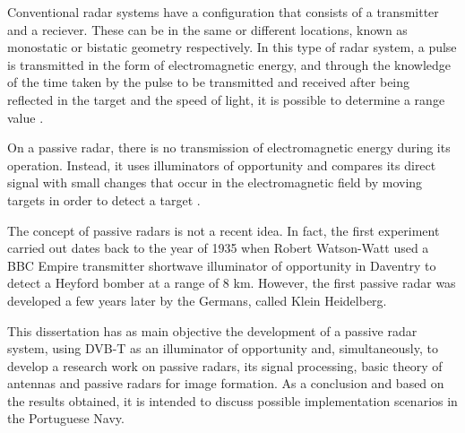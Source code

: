 \begin{abstractotherlanguage}



Conventional radar systems have a configuration that consists of a transmitter and a reciever. These can be in the same or different locations, known as monostatic or bistatic geometry respectively. In this type of radar system, a pulse is transmitted in the form of electromagnetic energy, and through the knowledge of the time taken by the pulse to be transmitted and received after being reflected in the target and the speed of light, it is possible to determine a range value .\par
On a passive radar, there is no transmission of electromagnetic energy during its operation. Instead, it uses illuminators of opportunity and compares its direct signal with small changes that occur in the electromagnetic field by moving targets in order to detect a target \parencite{Griffiths2017}. \par
The concept of passive radars is not a recent idea. In fact, the first experiment carried out dates back to the year of 1935 when Robert Watson-Watt used a BBC Empire transmitter shortwave illuminator of opportunity in Daventry to detect a Heyford bomber at a range of 8 km. However, the first passive radar was developed a few years later by the Germans, called Klein Heidelberg.\par 
This dissertation has as main objective the development of a passive radar system, using \gls{DVB-T} as an illuminator of opportunity and, simultaneously, to develop a research work on passive radars, its signal processing, basic theory of antennas and passive radars for image formation. As a conclusion and based on the results obtained, it is intended to discuss possible implementation scenarios in the Portuguese Navy.


\end{abstractotherlanguage}



